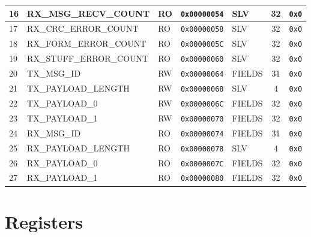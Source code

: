 \documentclass{article}
\begin{document}
\begin{table}[h!]
\begin{center}
\begin{tabularx}{\linewidth}{|l|X|l|l|l|c|l|}
      \hline
      16 & RX{\_}MSG{\_}RECV{\_}COUNT & RO & \texttt{0x00000054} & SLV & 32 & \texttt{0x0} \\
      \hline
      17 & RX{\_}CRC{\_}ERROR{\_}COUNT & RO & \texttt{0x00000058} & SLV & 32 & \texttt{0x0} \\
      \hline
      18 & RX{\_}FORM{\_}ERROR{\_}COUNT & RO & \texttt{0x0000005C} & SLV & 32 & \texttt{0x0} \\
      \hline
      19 & RX{\_}STUFF{\_}ERROR{\_}COUNT & RO & \texttt{0x00000060} & SLV & 32 & \texttt{0x0} \\
      \hline
      20 & TX{\_}MSG{\_}ID & RW & \texttt{0x00000064} & FIELDS & 31 & \texttt{0x0} \\
      \hline
      21 & TX{\_}PAYLOAD{\_}LENGTH & RW & \texttt{0x00000068} & SLV & 4 & \texttt{0x0} \\
      \hline
      22 & TX{\_}PAYLOAD{\_}0 & RW & \texttt{0x0000006C} & FIELDS & 32 & \texttt{0x0} \\
      \hline
      23 & TX{\_}PAYLOAD{\_}1 & RW & \texttt{0x00000070} & FIELDS & 32 & \texttt{0x0} \\
      \hline
      24 & RX{\_}MSG{\_}ID & RO & \texttt{0x00000074} & FIELDS & 31 & \texttt{0x0} \\
      \hline
      25 & RX{\_}PAYLOAD{\_}LENGTH & RO & \texttt{0x00000078} & SLV & 4 & \texttt{0x0} \\
      \hline
      26 & RX{\_}PAYLOAD{\_}0 & RO & \texttt{0x0000007C} & FIELDS & 32 & \texttt{0x0} \\
      \hline
      27 & RX{\_}PAYLOAD{\_}1 & RO & \texttt{0x00000080} & FIELDS & 32 & \texttt{0x0} \\
      \hline
    \end{tabularx}
  \end{center}
\end{table}

\section{Registers}
\end{document}
